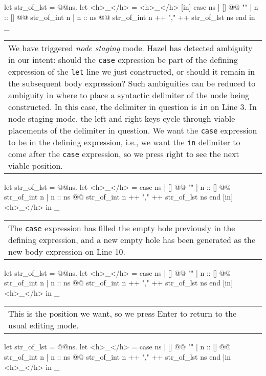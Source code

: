 \documentclass[runningheads]{llncs}
\newcommand{\Hazel}{\textsf{Hazel}\xspace}
\begin{document}
\begin{hazel}
let str_of_lst = 
	@\lam @ns.{
		let <h>_</h> = <h>_</h> [in]
		case ns
		| []      @\casearrow @ ""
		| n :: [] @\casearrow @ str_of_int n		
		| n :: ns @\casearrow @ str_of_int n ++ "," ++ str_of_lst ns
		end
	}
in
_
\end{hazel}
	\begin{tabular}{|p{\linewidth}}
	We have triggered \emph{node staging} mode. \Hazel has detected
	ambiguity in our intent: should the \texttt{case} expression be part of
	the defining expression of the \texttt{let} line we just constructed,
	or should it remain in the subsequent body expression? Such ambiguities
	can be reduced to ambiguity in where to place a syntactic delimiter
	of the node being constructed. In this case, the delimiter in question is
	\texttt{in} on Line 3. In node staging mode, the left and right
	keys cycle through viable placements of the delimiter in question.
	We want the \texttt{case} expression to be in the defining expression,
	i.e., we want the \texttt{in} delimiter to come after the \texttt{case}
	expression, so we press right to see the next viable position.
	\end{tabular}
\begin{hazel}
let str_of_lst = 
	@\lam @ns.{
		let <h>_</h> =
			case ns
			| []      @\casearrow @ ""
			| n :: [] @\casearrow @ str_of_int n		
			| n :: ns @\casearrow @ str_of_int n ++ "," ++ str_of_lst ns
			end
		[in]
		<h>_</h>
	}
in
_
\end{hazel}
	\begin{tabular}{|p{\linewidth}}
	The \texttt{case} expression has filled the empty hole previously in 
	the defining expression, and a new empty hole has been generated as the
	new body expression on Line 10.
	\end{tabular}
\begin{hazel}
let str_of_lst = 
	@\lam @ns.{
		let <h>_</h> =
			case ns
			| []      @\casearrow @ ""
			| n :: [] @\casearrow @ str_of_int n		
			| n :: ns @\casearrow @ str_of_int n ++ "," ++ str_of_lst ns
			end
		[in]
		<h>_</h>
	}
in
_
\end{hazel}
	\begin{tabular}{|p{\linewidth}}
	This is the position we want, so we press Enter to return to
	the usual editing mode.
	\end{tabular}
\begin{hazel}
let str_of_lst = 
	@\lam @ns.{
		let <h>_</h> =
			case ns
			| []      @\casearrow @ ""
			| n :: [] @\casearrow @ str_of_int n		
			| n :: ns @\casearrow @ str_of_int n ++ "," ++ str_of_lst ns
			end
		|in
		<h>_</h>
	}
in
_
\end{hazel}
\end{document}
